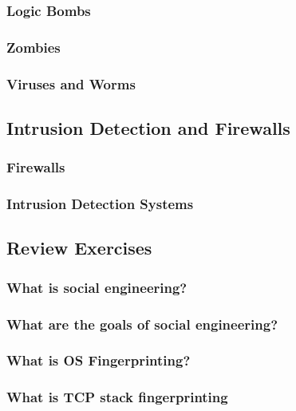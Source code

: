 \documentclass[a4paper, 10 pt, conference]{ieeeconf}
\begin{document}
\subsubsection{\textbf{Logic Bombs}}

\subsubsection{\textbf{Zombies}}

\subsubsection{\textbf{Viruses and Worms}}

\subsection{\textbf{Intrusion Detection and Firewalls}}

\subsubsection{\textbf{Firewalls}}

\subsubsection{\textbf{Intrusion Detection Systems}}



\subsection{\textbf{Review Exercises}}
\subsubsection{\textbf{What is social engineering?}}

\subsubsection{\textbf{What are the goals of social engineering?}}

\subsubsection{\textbf{What is OS Fingerprinting?}}

\subsubsection{\textbf{What is TCP stack fingerprinting}}
\end{document}

